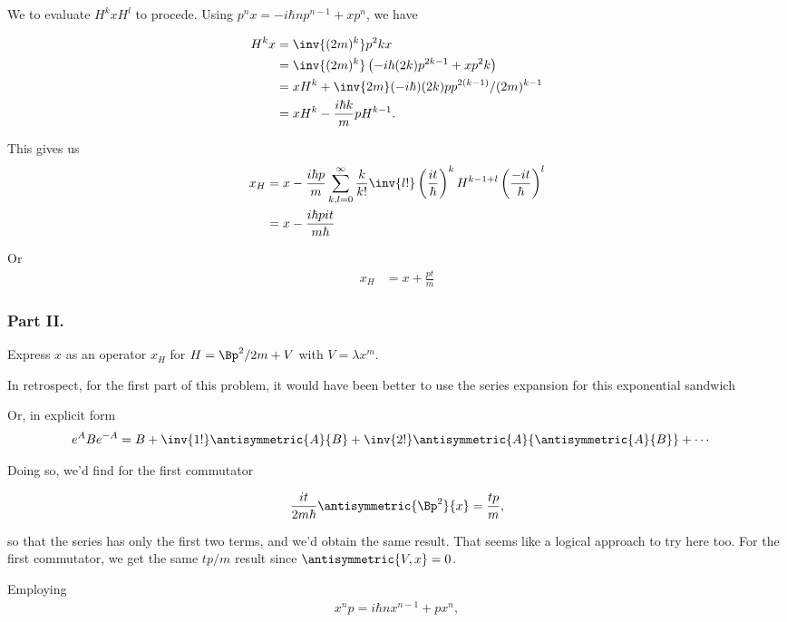 We to evaluate $H^k x H^l$ to procede.  Using $p^n x = -i \hbar n p^{n-1} + x p^n$, we have

\begin{align*}
H^k x 
&= \inv{(2m)^k} p^2k x \\
&= \inv{(2m)^k} \left( -i \hbar (2k) p^{2k -1} + x p^2k \right) \\
&= x H^k + \inv{2m} (-i \hbar) (2k) p p^{2(k-1)}/(2m)^{k-1} \\
&= x H^k - \frac{i \hbar k}{m} p H^{k-1}.
\end{align*}

This gives us
\begin{align*}
x_H 
&= x - \frac{i \hbar p }{m} \sum_{k,l=0}^\infty \frac{k}{k!} \inv{l!}
\left(\frac{i t}{\hbar}\right)^k H^{k-1 + l}
\left(\frac{-i t}{\hbar}\right)^l  \\
&= x - \frac{i \hbar p i t }{m \hbar} 
\end{align*}

Or
\begin{align}\label{eqn:desaiCh3:303}
x_H 
&= x + \frac{p t }{m} 
\end{align}


\subsubsection{Part II.}
Express $x$ as an operator $x_H$ for $H = \Bp^2/2m + V$ with $V = \lambda x^m$.

In retrospect, for the first part of this problem, it would have been better to use the series expansion for this exponential sandwich

Or, in explicit form
\begin{align}\label{eqn:desaiCh3:304}
e^A B e^{-A}
&=
B 
+ \inv{1!} \antisymmetric{A}{B}
+ \inv{2!} 
\antisymmetric{A}{\antisymmetric{A}{B}}
+ \cdots
\end{align}

Doing so, we'd find for the first commutator

\begin{align}\label{eqn:desaiCh3:305}
\frac{i t}{2m \hbar} \antisymmetric{\Bp^2}{x} = \frac{t p}{m},
\end{align}

so that the series has only the first two terms, and we'd obtain the same result.  That seems like a logical approach to try here too.  For the first commutator, we get the same $tp/m$ result since $\antisymmetric{V,x} = 0$.

Employing 
\begin{align}\label{eqn:desaiCh3:306}
x^n p = i \hbar n x^{n-1} + p x^n,
\end{align}

